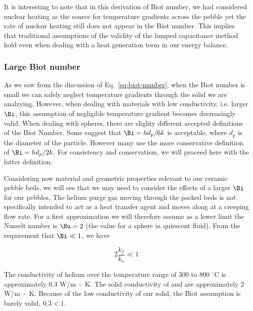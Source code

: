 It is interesting to note that in this derivation of Biot number, we had considered nuclear heating as the source for temperature gradients across the pebble yet the rate of nuclear heating still does not appear in the Biot number. This implies that traditional assumptions of the validity of the lumped capacitance method hold even when dealing with a heat generation term in our energy balance.




\subsubsection{Large Biot number}

As we saw from the discussion of Eq.~\ref{eq:biot-number}, when the Biot number is small we can safely neglect temperature gradients through the solid we are analzying. However, when dealing with materials with low conductivity, i.e. larger $\Bi$, this assumption of negligible temperature gradient becomes decreasingly valid.  When dealing with spheres, there are slighty different accepted definitions of the Biot Number.  Some suggest that $\Bi=hd_p/6k$ is acceptable\cite{incropera:245}, where $d_p$ is the diameter of the particle.  However many use the more conservative definition of $\Bi=hd_p/2k$\cite{incropera:245,jeffreson409}.  For consistency and conservatism, we will proceed here with the latter definition.  

Considering now material and geometric properties relevant to our ceramic pebble beds, we will see that we may need to consider the effects of a larger $\Bi$ for our pebbles. The helium purge gas moving through the packed beds is not specifically intended to act as a heat transfer agent and moves along at a creeping flow rate. For a first approximation we will therefore assume as a lower limit the Nusselt number is $\Nu = 2$ (the value for a sphere in quiescent fluid). From the requirement that $\Bi \ll 1$, we have

\begin{equation}
	2 \frac{k_f}{k_s} \ll 1
\end{equation}

The conductivity of helium over the temperature range of 300 to 800 $^\circ$C is approximately 0.3 \si{W/m-K}. The solid conductivity of \lit and \lis are approximately 2 \si{W/m-K}. Because of the low conductivity of our solid, the Biot assumption is barely valid, $0.3 < 1$. 





